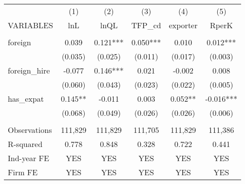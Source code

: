 \begin{tabular}{lccccc} \hline
 & (1) & (2) & (3) & (4) & (5) \\
VARIABLES & lnL & lnQL & TFP\_cd & exporter & RperK \\ \hline
 &  &  &  &  &  \\
foreign & 0.039 & 0.121*** & 0.050*** & 0.010 & 0.012*** \\
 & (0.035) & (0.025) & (0.011) & (0.017) & (0.003) \\
foreign\_hire & -0.077 & 0.146*** & 0.021 & -0.002 & 0.008 \\
 & (0.060) & (0.043) & (0.023) & (0.022) & (0.005) \\
has\_expat & 0.145** & -0.011 & 0.003 & 0.052** & -0.016*** \\
 & (0.068) & (0.049) & (0.026) & (0.026) & (0.006) \\
 &  &  &  &  &  \\
Observations & 111,829 & 111,829 & 111,705 & 111,829 & 111,386 \\
R-squared & 0.778 & 0.848 & 0.328 & 0.722 & 0.441 \\
Ind-year FE & YES & YES & YES & YES & YES \\
 Firm FE & YES & YES & YES & YES & YES \\ \hline
\end{tabular}
